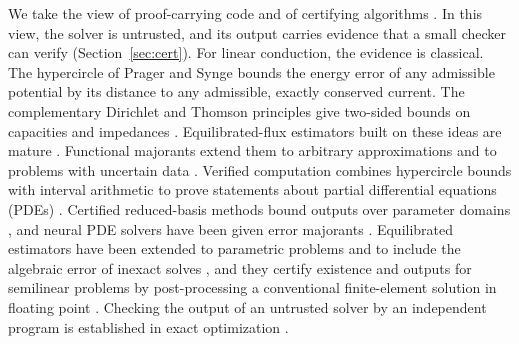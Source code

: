 \documentclass[11pt]{article}
\begin{document}
We take the view of proof-carrying code \cite{necula1997} and of certifying
algorithms \cite{mcconnell2011}. In this view, the solver is untrusted, and its
output carries evidence that a small checker can verify (Section~\ref{sec:cert}). For linear conduction, the
evidence is classical. The hypercircle of Prager and Synge
\cite{pragersynge1947,synge1957} bounds the energy error of any admissible
potential by its distance to any admissible, exactly conserved current. The
complementary Dirichlet and Thomson principles give two-sided bounds on
capacities and impedances \cite{polya1951}.
Equilibrated-flux estimators built on these ideas are mature
\cite{ladeveze1983,braess2009,ernvohralik2015}. Functional majorants extend
them to arbitrary approximations and to problems with uncertain data
\cite{repin2008,mali2014}. Verified computation combines hypercircle bounds with
interval arithmetic to prove statements about partial differential equations
(PDEs)
\cite{liuoishi2013,liu2021stokes,nakao2019}. Certified reduced-basis methods bound outputs
over parameter domains \cite{rozza2008}, and neural PDE solvers have been given
error majorants \cite{fanaskov2024}. Equilibrated estimators have been extended
to parametric problems \cite{eigel2016} and to include the algebraic error of
inexact solves \cite{papez2018}, and they certify existence and outputs for
semilinear problems by post-processing a conventional finite-element solution in
floating point \cite{ishizaka2026}. Checking the output of an untrusted solver by an
independent program is established in exact optimization \cite{cheung2017}.
\end{document}
